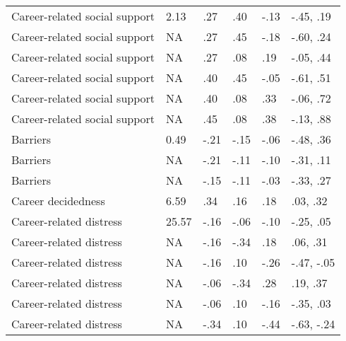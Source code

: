 \begin{table}[ht]
\begin{tabular}{llllll}
  \hspace{3mm} Career-related social support & 2.13 & .27 & .40 & -.13 & -.45, .19 \\ 
  \hspace{3mm} Career-related social support & NA & .27 & .45 & -.18 & -.60, .24 \\ 
  \hspace{3mm} Career-related social support & NA & .27 & .08 & .19 & -.05, .44 \\ 
  \hspace{3mm} Career-related social support & NA & .40 & .45 & -.05 & -.61, .51 \\ 
  \hspace{3mm} Career-related social support & NA & .40 & .08 & .33 & -.06, .72 \\ 
  \hspace{3mm} Career-related social support & NA & .45 & .08 & .38 & -.13, .88 \\ 
  \hspace{3mm} Barriers & 0.49 & -.21 & -.15 & -.06 & -.48, .36 \\ 
  \hspace{3mm} Barriers & NA & -.21 & -.11 & -.10 & -.31, .11 \\ 
  \hspace{3mm} Barriers & NA & -.15 & -.11 & -.03 & -.33, .27 \\ 
  \hspace{3mm} Career decidedness & 6.59 & .34 & .16 & .18 & .03, .32 \\ 
  \hspace{3mm} Career-related distress & 25.57 & -.16 & -.06 & -.10 & -.25, .05 \\ 
  \hspace{3mm} Career-related distress & NA & -.16 & -.34 & .18 & .06, .31 \\ 
  \hspace{3mm} Career-related distress & NA & -.16 & .10 & -.26 & -.47, -.05 \\ 
  \hspace{3mm} Career-related distress & NA & -.06 & -.34 & .28 & .19, .37 \\ 
  \hspace{3mm} Career-related distress & NA & -.06 & .10 & -.16 & -.35, .03 \\ 
  \hspace{3mm} Career-related distress & NA & -.34 & .10 & -.44 & -.63, -.24 \\ 
   \hline
\end{tabular}
\end{table}

